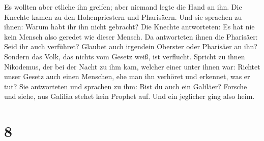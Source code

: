  Es wollten aber etliche ihn greifen; aber niemand legte
die Hand an ihn.  Die Knechte kamen zu den Hohenpriestern
und Pharisäern. Und sie sprachen zu ihnen: Warum habt ihr ihn nicht
gebracht?  Die Knechte antworteten: Es hat nie kein Mensch
also geredet wie dieser Mensch.  Da antworteten ihnen die
Pharisäer: Seid ihr auch verführet?  Glaubet auch irgendein
Oberster oder Pharisäer an ihn?  Sondern das Volk, das
nichts vom Gesetz weiß, ist verflucht.  Spricht zu ihnen
Nikodemus, der bei der Nacht zu ihm kam, welcher einer unter ihnen war:
 Richtet unser Gesetz auch einen Menschen, ehe man ihn
verhöret und erkennet, was er tut?  Sie antworteten und
sprachen zu ihm: Bist du auch ein Galiläer? Forsche und siehe, aus
Galiläa stehet kein Prophet auf.  Und ein jeglicher ging
also heim.

\hypertarget{section-7}{%
\section{8}\label{section-7}}

